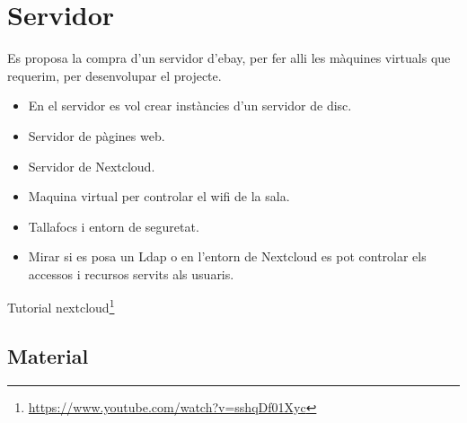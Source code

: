 \documentclass[
  10pt,
]{krantz}
\DeclareRobustCommand{\href}[2]{#2\footnote{\url{#1}}}
\begin{document}
\hypertarget{servidor-1}{%
\chapter{Servidor}\label{servidor-1}}

Es proposa la compra d'un servidor d'ebay, per fer alli les màquines virtuals que requerim, per desenvolupar el projecte.

\begin{itemize}
\item
  En el servidor es vol crear instàncies d'un servidor de disc.
\item
  Servidor de pàgines web.
\item
  Servidor de Nextcloud.
\item
  Maquina virtual per controlar el wifi de la sala.
\item
  Tallafocs i entorn de seguretat.
\item
  Mirar si es posa un Ldap o en l'entorn de Nextcloud es pot controlar els accessos i recursos servits als usuaris.
\end{itemize}

Tutorial \href{https://www.youtube.com/watch?v=sshqDf01Xyc}{nextcloud}

\hypertarget{material}{%
\section{Material}\label{material}}
\end{document}
